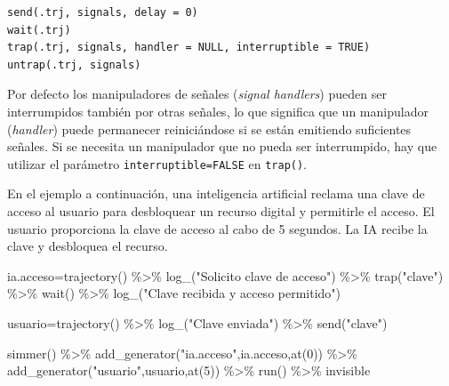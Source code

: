 \documentclass[
]{book}
\newenvironment{Shaded}{\begin{snugshade}}{\end{snugshade}}
\newcommand{\DecValTok}[1]{\textcolor[rgb]{0.00,0.00,0.81}{#1}}
\newcommand{\FunctionTok}[1]{\textcolor[rgb]{0.00,0.00,0.00}{#1}}
\newcommand{\NormalTok}[1]{#1}
\newcommand{\OtherTok}[1]{\textcolor[rgb]{0.56,0.35,0.01}{#1}}
\newcommand{\SpecialCharTok}[1]{\textcolor[rgb]{0.00,0.00,0.00}{#1}}
\newcommand{\StringTok}[1]{\textcolor[rgb]{0.31,0.60,0.02}{#1}}
\theoremstyle{definition}
\theoremstyle{definition}
\theoremstyle{definition}
\theoremstyle{definition}
\theoremstyle{remark}
\begin{document}
\begin{verbatim}
send(.trj, signals, delay = 0)
wait(.trj)
trap(.trj, signals, handler = NULL, interruptible = TRUE)
untrap(.trj, signals)
\end{verbatim}

Por defecto los manipuladores de señales (\emph{signal handlers}) pueden ser interrumpidos también por otras señales, lo que significa que un manipulador (\emph{handler}) puede permanecer reiniciándose si se están emitiendo suficientes señales. Si se necesita un manipulador que no pueda ser interrumpido, hay que utilizar el parámetro \texttt{interruptible=FALSE} en \texttt{trap()}.

En el ejemplo a continuación, una inteligencia artificial reclama una clave de acceso al usuario para desbloquear un recurso digital y permitirle el acceso. El usuario proporciona la clave de acceso al cabo de 5 segundos. La IA recibe la clave y desbloquea el recurso.

\begin{Shaded}
\begin{Highlighting}[]
\NormalTok{ia.acceso}\OtherTok{=}\FunctionTok{trajectory}\NormalTok{() }\SpecialCharTok{\%\textgreater{}\%}
  \FunctionTok{log\_}\NormalTok{(}\StringTok{"Solicito clave de acceso"}\NormalTok{) }\SpecialCharTok{\%\textgreater{}\%}
  \FunctionTok{trap}\NormalTok{(}\StringTok{"clave"}\NormalTok{) }\SpecialCharTok{\%\textgreater{}\%}
  \FunctionTok{wait}\NormalTok{() }\SpecialCharTok{\%\textgreater{}\%}  
  \FunctionTok{log\_}\NormalTok{(}\StringTok{"Clave recibida y acceso permitido"}\NormalTok{)}

\NormalTok{usuario}\OtherTok{=}\FunctionTok{trajectory}\NormalTok{() }\SpecialCharTok{\%\textgreater{}\%}
  \FunctionTok{log\_}\NormalTok{(}\StringTok{"Clave enviada"}\NormalTok{) }\SpecialCharTok{\%\textgreater{}\%}
  \FunctionTok{send}\NormalTok{(}\StringTok{"clave"}\NormalTok{) }
  
\FunctionTok{simmer}\NormalTok{() }\SpecialCharTok{\%\textgreater{}\%}
  \FunctionTok{add\_generator}\NormalTok{(}\StringTok{"ia.acceso"}\NormalTok{,ia.acceso,}\FunctionTok{at}\NormalTok{(}\DecValTok{0}\NormalTok{)) }\SpecialCharTok{\%\textgreater{}\%}
  \FunctionTok{add\_generator}\NormalTok{(}\StringTok{"usuario"}\NormalTok{,usuario,}\FunctionTok{at}\NormalTok{(}\DecValTok{5}\NormalTok{)) }\SpecialCharTok{\%\textgreater{}\%}
  \FunctionTok{run}\NormalTok{() }\SpecialCharTok{\%\textgreater{}\%}
\NormalTok{  invisible}
\end{Highlighting}
\end{Shaded}
\end{document}
